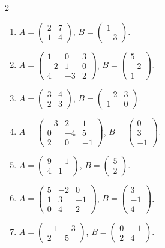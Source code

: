 \begin{multicols}{2}
\begin{enumerate}[label=\arabic*.,  leftmargin=*]
\item $A=\begin{pmatrix}2&7\\1&4\end{pmatrix}$, $B=\begin{pmatrix}1\\-3\end{pmatrix}$.
\item $A=\begin{pmatrix}1&0&3\\-2&1&0\\4&-3&2\end{pmatrix}$, $B=\begin{pmatrix}5\\-2\\1\end{pmatrix}$.
\item $A=\begin{pmatrix}3&4\\2&3\end{pmatrix}$, $B=\begin{pmatrix}-2&3\\1&0\end{pmatrix}$.
\item $A=\begin{pmatrix}-3&2&1\\0&-4&5\\2&0&-1\end{pmatrix}$, $B=\begin{pmatrix}0\\3\\-1\end{pmatrix}$.
\item $A=\begin{pmatrix}9&-1\\4&1\end{pmatrix}$, $B=\begin{pmatrix}5\\2\end{pmatrix}$.
\item $A=\begin{pmatrix}5&-2&0\\1&3&-1\\0&4&2\end{pmatrix}$, $B=\begin{pmatrix}3\\-1\\4\end{pmatrix}$.
\item $A=\begin{pmatrix}-1&-3\\2&5\end{pmatrix}$, $B=\begin{pmatrix}0&-1\\2&4\end{pmatrix}$.

\end{enumerate}
\end{multicols}
